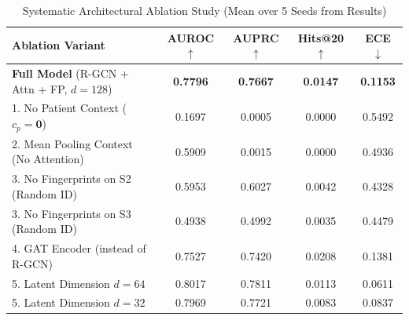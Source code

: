 \begin{table}[t]
\centering
\caption{Systematic Architectural Ablation Study (Mean over 5 Seeds from Results)}
\label{tab:ablations}
\begin{tabular}{lcccc}
\toprule
\textbf{Ablation Variant} & \textbf{AUROC} $\uparrow$ & \textbf{AUPRC} $\uparrow$ & \textbf{Hits@20} $\uparrow$ & \textbf{ECE} $\downarrow$ \\
\midrule
\textbf{Full Model} (R-GCN + Attn + FP, $d=128$) & \textbf{0.7796} & \textbf{0.7667} & \textbf{0.0147} & \textbf{0.1153} \\
1. No Patient Context ($c_p = \mathbf{0}$) & 0.1697 & 0.0005 & 0.0000 & 0.5492 \\
2. Mean Pooling Context (No Attention) & 0.5909 & 0.0015 & 0.0000 & 0.4936 \\
3. No Fingerprints on S2 (Random ID) & 0.5953 & 0.6027 & 0.0042 & 0.4328 \\
3. No Fingerprints on S3 (Random ID) & 0.4938 & 0.4992 & 0.0035 & 0.4479 \\
4. GAT Encoder (instead of R-GCN) & 0.7527 & 0.7420 & 0.0208 & 0.1381 \\
5. Latent Dimension $d=64$ & 0.8017 & 0.7811 & 0.0113 & 0.0611 \\
5. Latent Dimension $d=32$ & 0.7969 & 0.7721 & 0.0083 & 0.0837 \\
\bottomrule
\end{tabular}
\end{table}
